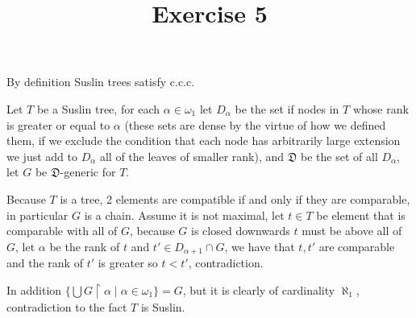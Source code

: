 

\usepackage{skak}
\usepackage{relsize}
\usepackage{graphicx}
\usepackage{mathtools}

\usepackage{textcomp}
\usepackage{bbding}

\usepackage{soul}



\title{Exercise 5}

\maketitle
\begin{cExercise}
	By definition Suslin trees satisfy c.c.c. 
	
	Let $T$ be a Suslin tree, for each $\alpha\in\omega_1$ let $D_\alpha$ be the set if nodes in $T$ whose rank is greater or equal to $\alpha$ (these sets are dense by the virtue of how we defined them, if we exclude the condition that each node has arbitrarily large extension we just add to $D_\alpha$ all of the leaves of smaller rank), and $\mathfrak{D}$ be the set of all $D_\alpha$, let $G$ be $\mathfrak{D}$-generic for $T$.
	
	Because $T$ is a tree, 2 elements are compatible if and only if they are comparable, in particular $G$ is a chain. Assume it is not maximal, let $t\in T$ be element that is comparable with all of $G$, because $G$ is closed downwards $t$ must be above all of $G$, let $\alpha$ be the rank of $t$ and $t'\in D_{\alpha+1}\cap G$, we have that $t,t'$ are comparable and the rank of $t'$ is greater so $t<t'$, contradiction.
	
	In addition $\{\bigcup G\restriction \alpha\mid \alpha\in\omega_1\}=G$, but it is clearly of cardinality $\aleph_1$, contradiction to the fact $T$ is Suslin.
\end{cExercise}

